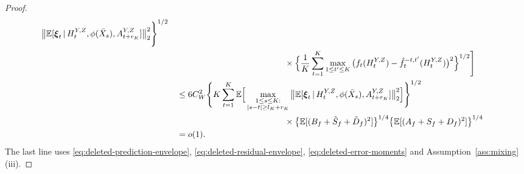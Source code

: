 \documentclass[12pt]{article}
\def\E{\mathbb{E}}
\newcommand\given{\,|\,}
\numberwithin{equation}{section}
\begin{document}
\begin{proof}
\begin{align}
\big\|\E[\boldsymbol\xi_t\given
H_t^{Y,Z},\phi(\bar X_s),A_{t+r_K}^{Y,Z}]\big\|_2^2
\Bigg\}^{1/2}
\notag\\*
&\hspace{48mm}{}\times
\Big\{\frac1K\sum_{t=1}^K
\max_{1\leq t'\leq K}
\big(f_t(H_t^{Y,Z})-\hat f_t^{-t,t'}(H_t^{Y,Z})\big)^2
\Big\}^{1/2}
\Bigg]
\notag\\
&\quad\leq6C_W^2
\Bigg\{K\sum_{t=1}^K
\E\Big[
\max_{\substack{1\leq s\leq K:\\|s-t|\geq l_K+r_K}}
\big\|\E[\boldsymbol\xi_t\given
H_t^{Y,Z},\phi(\bar X_s),A_{t+r_K}^{Y,Z}]\big\|_2^2
\Big]\Bigg\}^{1/2}
\notag\\*
&\hspace{48mm}{}\times
\big\{\E[(B_f+\tilde S_f+\tilde D_f)^2]\big\}^{1/4}
\big\{\E[(A_f+S_f+D_f)^2]\big\}^{1/4}
\notag\\
&\quad=o(1).
\label{eq:outcome-separated-bound}
\end{align}
The last line uses \eqref{eq:deleted-prediction-envelope},
\eqref{eq:deleted-residual-envelope}, \eqref{eq:deleted-error-moments}
and Assumption~\ref{ass:mixing}(iii).


\end{proof}
\end{document}
